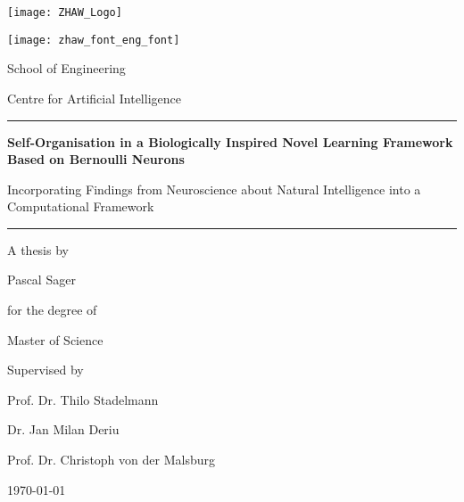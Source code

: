 \begin{titlepage}

\setlength{\parskip}{0pt}

\begin{center}
\texttt{[image: ZHAW\_Logo]}

\vspace{0.87cm}
{\texttt{[image: zhaw\_font\_eng\_font]}\par}
\vspace{0.4cm}
{\Large School of Engineering \par}
\vspace{0.15cm}
{\Large Centre for Artificial Intelligence\par}

\vspace{1.5cm}                            
\par\noindent\rule{\textwidth}{0.4pt}

\vspace{0.2cm}
{\par\huge\bfseries Self-Organisation in a Biologically Inspired Novel Learning Framework Based on Bernoulli Neurons\par}
\vspace{0.4cm}
{\par\Large Incorporating Findings from Neuroscience about Natural Intelligence into a Computational Framework\par}
\vspace{0.2cm}  

\par\noindent\rule{\textwidth}{0.4pt}
\vspace{1.2cm}

{\par\noindent\large A thesis by}
\vspace{0.25cm}
{\par\noindent\Large Pascal Sager}
\vspace{1.0cm}
{\par\noindent\large for the degree of}
\vspace{0.25cm}
{\par\noindent\Large  Master of Science}
\vspace{1.0cm}

{\par\noindent\large Supervised by}
\vspace{0.25cm}
{\par\noindent\Large Prof. Dr. Thilo Stadelmann}
\vspace{0.2cm}
{\par\noindent\Large Dr. Jan Milan Deriu}
\vspace{0.2cm}
{\par\noindent\Large Prof. Dr. Christoph von der Malsburg}

\vspace{1.2cm} 
{\Large \today}

\end{center}
\end{titlepage}
\restoregeometry

